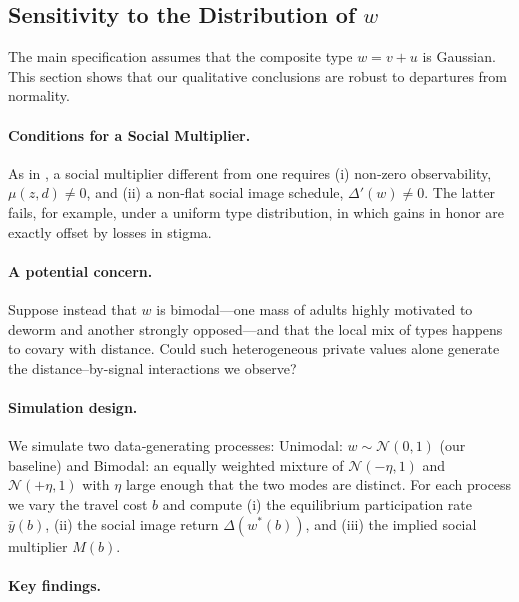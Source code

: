 \documentclass[12pt,a4paper]{article}
\begin{document}
\clearpage

\setcounter{table}{0}
\renewcommand{\thetable}{J\arabic{table}}

\setcounter{figure}{0}
\renewcommand{\thefigure}{J\arabic{figure}}

\subsection{Sensitivity to the Distribution of \texorpdfstring{$w$}{w}}\label{sec:robust-w}

The main specification assumes that the composite type \(w=v+u\) is Gaussian.  
This section shows that our qualitative conclusions are robust to departures from normality.

\paragraph{Conditions for a Social Multiplier.}
As in \citet{Benabou_laws_2011}, a social multiplier different from one requires  
(i) non‑zero observability, $\mu(z,d)\neq 0$, and  
(ii) a non‑flat social image schedule, $\Delta'(w)\neq 0$.  
The latter fails, for example, under a uniform type distribution, in which gains in honor are exactly offset by losses in stigma.

\paragraph{A potential concern.}
Suppose instead that $w$ is bimodal—one mass of adults highly motivated to deworm and another strongly opposed—and that the local mix of types happens to covary with distance. Could such heterogeneous private values alone generate the distance–by-signal interactions we observe?

\paragraph{Simulation design.}
We simulate two data‑generating processes: Unimodal: $w\sim\mathcal N(0,1)$ (our baseline) and Bimodal: an equally weighted mixture of \(\mathcal N(-\eta,1)\) and \(\mathcal N(+\eta,1)\) with \(\eta\) large enough that the two modes are distinct. For each process we vary the travel cost \(b\) and compute  
(i) the equilibrium participation rate $\bar{y}(b)$,  
(ii) the social image return $\Delta(w^{\ast}(b))$, and  
(iii) the implied social multiplier $M(b)$.

\paragraph{Key findings.}
\end{document}
